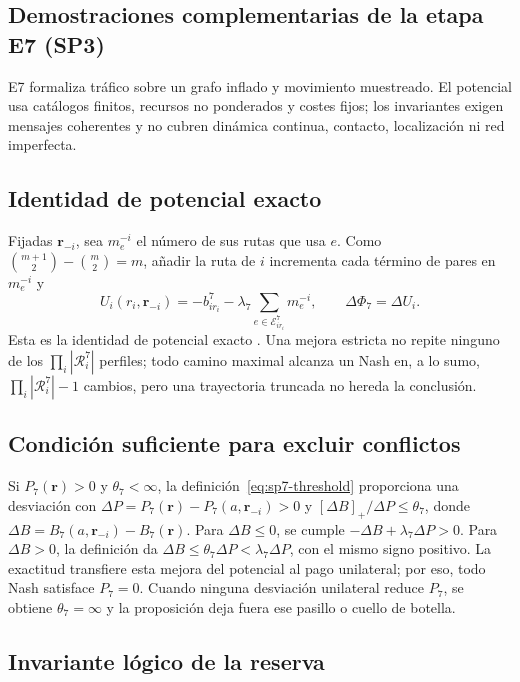 \subsection{Demostraciones complementarias de la etapa E7 (SP3)}
\label{app:sp7-proofs}

E7 formaliza tráfico sobre un grafo inflado y movimiento muestreado. El potencial usa catálogos finitos, recursos no ponderados y costes fijos; los invariantes exigen mensajes coherentes y no cubren dinámica continua, contacto, localización ni red imperfecta.

\subsection{Identidad de potencial exacto}
\label{app:sp7-potential-proof}

Fijadas $\boldsymbol r_{-i}$, sea $m_e^{-i}$ el número de sus rutas que usa $e$. Como $\binom{m+1}{2}-\binom m2=m$, añadir la ruta de $i$ incrementa cada término de pares en $m_e^{-i}$ y
\[
 U_i(r_i,\boldsymbol r_{-i})=-b_{ir_i}^7-\lambda_7\sum_{e\in\mathcal E_{ir_i}^7}m_e^{-i},\qquad
 \Delta\Phi_7=\Delta U_i.
\]
Esta es la identidad de potencial exacto \parencite{monderer1996potential}. Una mejora estricta no repite ninguno de los \(\prod_i|\mathcal R_i^7|\) perfiles; todo camino maximal alcanza un Nash en, a lo sumo, \(\prod_i|\mathcal R_i^7|-1\) cambios, pero una trayectoria truncada no hereda la conclusión.

\subsection{Condición suficiente para excluir conflictos}
\label{app:sp7-conflict-free-proof}

Si $P_7(\boldsymbol r)>0$ y $\theta_7<\infty$, la definición~\eqref{eq:sp7-threshold} proporciona una desviación con $\Delta P=P_7(\boldsymbol r)-P_7(a,\boldsymbol r_{-i})>0$ y $[\Delta B]_+/\Delta P\leq\theta_7$, donde $\Delta B=B_7(a,\boldsymbol r_{-i})-B_7(\boldsymbol r)$. Para \(\Delta B\leq0\), se cumple \(-\Delta B+\lambda_7\Delta P>0\). Para \(\Delta B>0\), la definición da \(\Delta B\leq\theta_7\Delta P<\lambda_7\Delta P\), con el mismo signo positivo. La exactitud transfiere esta mejora del potencial al pago unilateral; por eso, todo Nash satisface \(P_7=0\). Cuando ninguna desviación unilateral reduce \(P_7\), se obtiene \(\theta_7=\infty\) y la proposición deja fuera ese pasillo o cuello de botella.

\subsection{Invariante lógico de la reserva}
\label{app:sp7-reservation-invariant}

